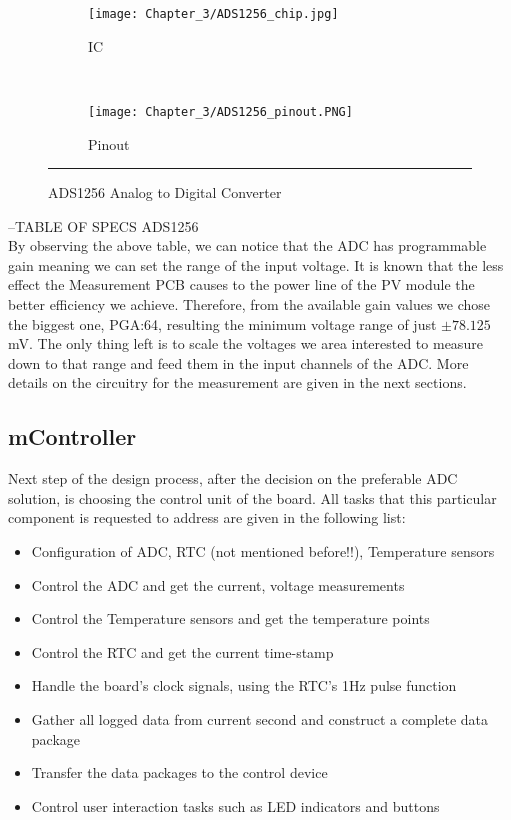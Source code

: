 \begin{figure}[htbp]
	\centering
	\begin{subfigure}[b]{.4\textwidth}
		\texttt{[image: Chapter\_3/ADS1256\_chip.jpg]}
	    \caption[]{IC}
	    \label{fig:ADS1256_chip}
	\end{subfigure}
    ~
	\begin{subfigure}[b]{.4\textwidth}
		\texttt{[image: Chapter\_3/ADS1256\_pinout.PNG]}
	    \caption[]{Pinout}
	    \label{fig:ADS1256_pinout}
	\end{subfigure}
	\rule{35em}{0.5pt}
	\caption{ADS1256 Analog to Digital Converter}
	\label{fig:ADS1256}
\end{figure}


--TABLE OF SPECS ADS1256\\

By observing the above table, we can notice that the ADC has programmable gain meaning we can set the range of the input voltage. It is known that the less effect the Measurement PCB causes to the power line of the PV module the better efficiency we achieve. Therefore, from the available gain values we chose the biggest one, PGA:64, resulting the minimum voltage range of just $\pm 78.125$mV. The only thing left is to scale the voltages we area interested to measure down to that range and feed them in the input channels of the ADC. More details on the circuitry for the measurement are given in the next sections.

\subsection{mController}
Next step of the design process, after the decision on the preferable ADC solution, is choosing the control unit of the board. All tasks that this particular component is requested to address are given in the following list:

\begin{itemize}
    \item Configuration of ADC, RTC (not mentioned before!!), Temperature sensors
    \item Control the ADC and get the current, voltage measurements
    \item Control the Temperature sensors and get the temperature points
    \item Control the RTC and get the current time-stamp
    \item Handle the board's clock signals, using the RTC's 1Hz pulse function
    \item Gather all logged data from current second and construct a complete data package
    \item Transfer the data packages to the control device
    \item Control user interaction tasks such as LED indicators and buttons
\end{itemize}


